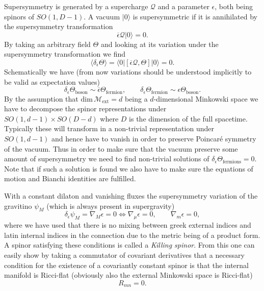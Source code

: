 Supersymmetry is generated by a supercharge $\mathcal{Q}$ and a parameter $\epsilon$, both being spinors of $SO(1,D-1)$. A vacuum $|0\rangle$ is supersymmetric if it is annihilated by the supersymmetry transformation
\begin{equation}
    \overbar{\epsilon}\mathcal{Q}|0\rangle = 0.
\end{equation}
By taking an arbitrary field $\Theta$ and looking at its variation under the supersymmetry transformation we find 
\begin{equation}
    \langle \delta_{\epsilon}\Theta\rangle = \langle 0|\left[\overbar{\epsilon}\mathcal{Q},\Theta\right]|0\rangle = 0.
\end{equation}
Schematically we have (from now variations should be understood implicitly to be valid as expectation values)
\begin{equation}
    \delta_\epsilon \Theta_{\text{boson}} \sim \overbar{\epsilon}\Theta_{\text{fermion}},\qquad \delta_\epsilon \Theta_{\text{fermion}}\sim \epsilon\Theta_{\text{boson}}.
\end{equation}
By the assumption that $\text{dim}\,\mathcal{M}{_{\text{ext}}}=d$ being a $d$-dimensional Minkowski space we have to decompose the spinor representations under $SO(1,d-1)\times SO(D-d)$ where $D$ is the dimension of the full spacetime. Typically these will transform in a non-trivial representation under $SO(1,d-1)$ and hence have to vanish in order to preserve Poincaré symmetry of the vacuum. Thus in order to make sure that the vacuum preserve some amount of supersymmetry we need to find non-trivial solutions of $\delta_\epsilon\Theta_{\text{fermions}}=0$. Note that if such a solution is found we also have to make sure the equations of motion and Bianchi identities are fulfilled. 

With a constant dilaton and vanishing fluxes the supersymmetry variation of the gravitino $\psi_M$ (which is always present in supergravity) \cite{Blumenhagen2013}
\begin{equation}
    \delta_\epsilon\psi_M = \nabla_M\epsilon = 0 \Leftrightarrow \nabla_\mu \epsilon = 0,\qquad \nabla_m\epsilon = 0,
\end{equation}
where we have used that there is no mixing between greek external indices and latin internal indices in the connection due to the metric being of a product form. A spinor satisfying these conditions is called a \emph{Killing spinor}. From this one can easily show by taking a commutator of covariant derivatives that a necessary condition for the existence of a covariantly constant spinor is that the internal manifold is Ricci-flat (obviously also the external Minkowski space is Ricci-flat)
\begin{equation}
    R_{mn} = 0.
\end{equation}


